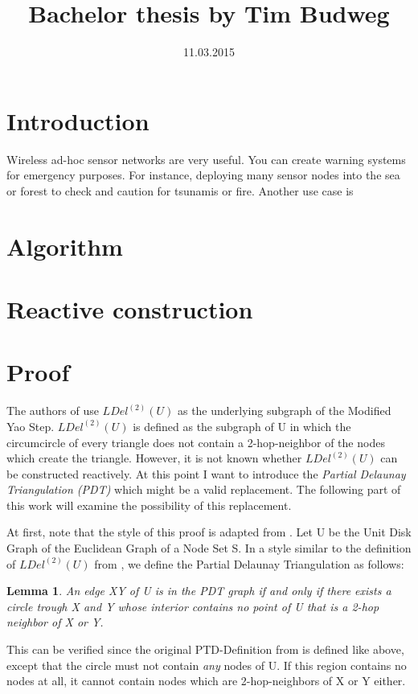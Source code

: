 \documentclass[a4paper,twoside, onecolumn]{IEEEtran}
\title{Bachelor thesis by Tim Budweg}
\author{}
\date{11.03.2015}
\newtheorem{emptycircle}{Lemma}[section]
\begin{document}
\maketitle

\section{Introduction}
Wireless ad-hoc sensor networks are very useful. 
You can create warning systems for emergency purposes.
For instance, deploying many sensor nodes into the sea or forest to check and caution for tsunamis or fire.
Another use case is
\section{Algorithm}
\section{Reactive construction}
\section{Proof}
The authors of \cite{kanj} use $LDel^{(2)}(U) $ as the underlying subgraph of the Modified Yao Step.
$LDel^{(2)}(U) $ is defined as the subgraph of U in which the circumcircle of every triangle does not contain a 2-hop-neighbor of the nodes which create the triangle.
However, it is not known whether $LDel^{(2)}(U) $ can be constructed reactively.
At this point I want to introduce the \emph{Partial Delaunay Triangulation (PDT)} \cite{pdt} which might be a valid replacement.
The following part of this work will examine the possibility of this replacement.

At first, note that the style of this proof is adapted from \cite{kanj}.
Let U be the Unit Disk Graph of the Euclidean Graph of a Node Set S.
In a style similar to the definition of $LDel^{(2)}(U) $ from \cite{kanj}, we define the Partial Delaunay Triangulation as follows:
\begin{emptycircle}
\label{emptycircle}
An edge XY of U is in the PDT graph if and only if there exists a circle trough X and Y whose interior contains no point of U that is a 2-hop neighbor of X or Y.
\end{emptycircle}
This can be verified since the original PTD-Definition from \cite{pdt} is defined like above, except that the circle must not contain \emph{any} nodes of U. 
If this region contains no nodes at all, it cannot contain nodes which are 2-hop-neighbors of X or Y either.  
\end{document}
